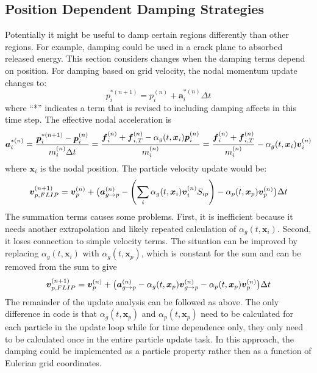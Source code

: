 \documentclass[11pt]{article}
\renewcommand{\vec}[1]{\boldsymbol{#1}}
\begin{document}
\subsection{Position Dependent Damping Strategies}

Potentially it might be useful to damp certain regions differently than other regions. For example, damping could be used in a crack plane to absorbed released energy. This section considers changes when the damping terms depend on position. For damping based on grid velocity, the nodal momentum update changes to:
\begin{equation}
     p_i^{*(n+1)} = p_i^{(n)} + \vec a_i^{*(n)}\Delta t
\end{equation}
where ``*'' indicates a term that is revised to including damping affects in this time step. The effective nodal acceleration is
\begin{equation}
    \vec a_i^{*(n)} = {\vec p_i^{*(n+1)}-\vec p_i^{(n)} \over m_i^{(n)}\Delta t}
         =  { \vec f_{i}^{(n)} + \vec f_{i,T}^{(n)} - \alpha_g(t,\vec x_i)\vec p_i^{(n)}  \over m_i^{(n)}}
          =  { \vec f_{i}^{(n)} + \vec f_{i,T}^{(n)} \over m_i^{(n)}}  -  \alpha_g(t,\vec x_i)\vec v_i^{(n)}  
\end{equation}
where $\vec x_i$ is the nodal position. The particle velocity update would be:
\begin{equation}
  \vec{v}_{p,FLIP}^{(n+1)} = \vec{v}_p^{(n)} + \bigl(\vec{a}_{g\to p}^{(n)} -\left(\sum_i \alpha_g(t,\vec x_i)\vec v_i^{(n)}S_{ip}\right)  -  \alpha_p(t,\vec x_p)\vec{v}_p^{(n)} \bigr)\Delta t   \\
\end{equation}
The summation terms causes some problems. First, it is inefficient because it needs another extrapolation and likely repeated calculation of $\alpha_g(t,\vec x_i)$. Second, it loses connection to simple velocity terms. The situation can be improved by replacing $\alpha_g(t,\vec x_i)$ with $\alpha_g(t,\vec x_p)$, which is constant for the sum and can be removed from the sum to give 
\begin{equation}
  \vec{v}_{p,FLIP}^{(n+1)} = \vec{v}_p^{(n)} + \bigl(\vec{a}_{g\to p}^{(n)} - \alpha_g(t,\vec x_p)\vec v_{g\to p}^{(n)} -  \alpha_p(t,\vec x_p)\vec{v}_p^{(n)} \bigr)\Delta t   \\
\end{equation}
The remainder of the update analysis can be followed as above. The only difference in code is that $\alpha_g(t,\vec x_p)$ and $\alpha_p(t,\vec x_p)$ need to be calculated for each particle in the update loop while for time dependence only, they only need to be calculated once in the entire particle update task. In this approach, the damping could be implemented as a particle property rather then as a function of Eulerian grid coordinates.
\end{document}
